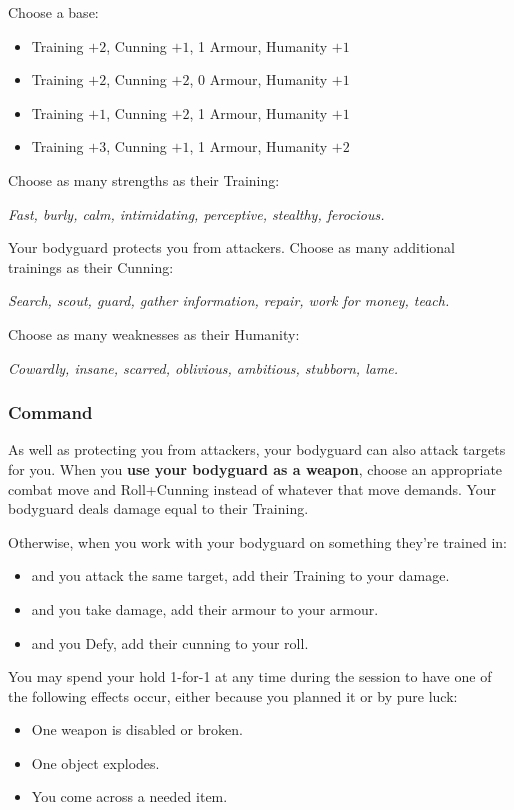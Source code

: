 Choose a base:
\begin{itemize}
\item Training $+2$, Cunning $+1$, 1 Armour, Humanity $+1$
\item Training $+2$, Cunning $+2$, 0 Armour, Humanity $+1$
\item Training $+1$, Cunning $+2$, 1 Armour, Humanity $+1$
\item Training $+3$, Cunning $+1$, 1 Armour, Humanity $+2$
\end{itemize}

Choose as many strengths as their Training:

\textit{Fast, burly, calm, intimidating, perceptive, stealthy, ferocious.}

Your bodyguard protects you from attackers. Choose as many additional trainings as their Cunning:

\textit{Search, scout, guard, gather information, repair, work for money, teach.}

Choose as many weaknesses as their Humanity:

\textit{Cowardly, insane, scarred, oblivious, ambitious, stubborn, lame.}

\subsubsection{Command}
As well as protecting you from attackers, your bodyguard can also attack targets for you. When you \textbf{use your bodyguard as a weapon}, choose an appropriate combat move and Roll+Cunning instead of whatever that move demands. Your bodyguard deals damage equal to their Training.

Otherwise, when you work with your bodyguard on something they're trained in:
\begin{itemize}
\item and you attack the same target, add their Training to your damage.
\item and you take damage, add their armour to your armour.
\item and you Defy, add their cunning to your roll.
\end{itemize}


You may spend your hold 1-for-1 at any time during the session to have one of the following effects occur, either because you planned it or by pure luck:
\begin{itemize}
\item One weapon is disabled or broken.
\item One object explodes.
\item You come across a needed item.
\end{itemize}

